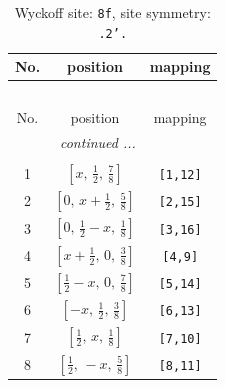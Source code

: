 \documentclass[fleqn,8pt]{jsarticle}
\begin{document}
\begin{longtable}{ccc}
\caption{Wyckoff site: {\tt 8f}, site symmetry: {\tt .2'.}}
 \\
 \hline \hline
No. & position & mapping \\ \hline \endfirsthead

\multicolumn{2}{l}{\tablename\ \thetable{}} \\
 \hline \hline
No. & position & mapping \\ \hline \endhead

 \hline \hline
\multicolumn{2}{r}{\footnotesize\it continued ...} \\ \endfoot

 \hline \hline
\multicolumn{2}{r}{} \\ \endlastfoot

1 & $\left[ x,\, \frac{1}{2},\, \frac{7}{8} \right]$ & {\tt [1,12]} \\ \hline
2 & $\left[ 0,\, x + \frac{1}{2},\, \frac{5}{8} \right]$ & {\tt [2,15]} \\ \hline
3 & $\left[ 0,\, \frac{1}{2} - x,\, \frac{1}{8} \right]$ & {\tt [3,16]} \\ \hline
4 & $\left[ x + \frac{1}{2},\, 0,\, \frac{3}{8} \right]$ & {\tt [4,9]} \\ \hline
5 & $\left[ \frac{1}{2} - x,\, 0,\, \frac{7}{8} \right]$ & {\tt [5,14]} \\ \hline
6 & $\left[ - x,\, \frac{1}{2},\, \frac{3}{8} \right]$ & {\tt [6,13]} \\ \hline
7 & $\left[ \frac{1}{2},\, x,\, \frac{1}{8} \right]$ & {\tt [7,10]} \\ \hline
8 & $\left[ \frac{1}{2},\, - x,\, \frac{5}{8} \right]$ & {\tt [8,11]} \\
\end{longtable}
\renewcommand{\arraystretch}{1.2}
\end{document}
